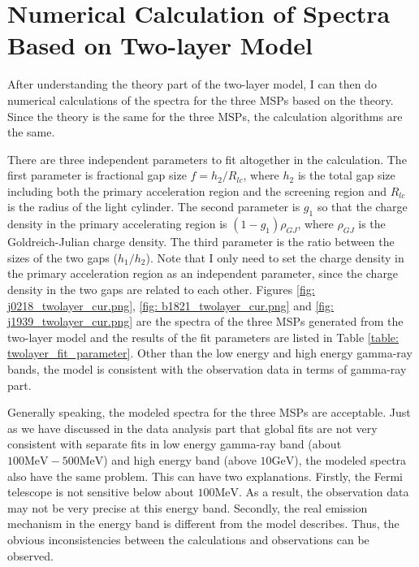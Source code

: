 \documentclass[12pt]{report}
\begin{document}
      \section{Numerical Calculation of Spectra Based on Two-layer Model}
        After understanding the theory part of the two-layer model, 
        I can then do numerical calculations of the spectra for the three MSPs
        based on the theory. Since the theory is the same for the three MSPs, the 
        calculation algorithms are the same. 

        There are three independent parameters to fit altogether in the calculation. 
        The first parameter is fractional gap size $f=h_{2}/R_{lc}$, where $h_{2}$ is the 
        total gap size including both the primary acceleration region and the screening region 
        and $R_{lc}$ is the radius of the light cylinder. The second parameter is $g_{1}$ so that
        the charge density in the primary accelerating region is $\left(1-g_{1}\right) \rho_{GJ}$, 
        where $\rho_{GJ}$ is the Goldreich-Julian charge density. The third parameter is the ratio 
        between the sizes of the two gaps ($h_{1}/h_{2}$). Note that I only need to set the charge 
        density in the primary acceleration region as an independent parameter, since the charge 
        density in the two gaps are related to each other. Figures 
        \ref{fig: j0218_twolayer_cur.png}, \ref{fig: b1821_twolayer_cur.png} and 
        \ref{fig: j1939_twolayer_cur.png}
        are the spectra of the three MSPs generated from the two-layer model and the results of the 
        fit parameters are listed in Table \ref{table: twolayer_fit_parameter}. Other than the 
        low energy and high energy gamma-ray bands, the model is consistent with the observation 
        data in terms of gamma-ray part. 

        Generally speaking, the modeled spectra for the three MSPs are acceptable. Just as 
        we have discussed in the data analysis part that global fits are not very consistent 
        with separate fits in low energy gamma-ray band (about $100\mbox{MeV} - 500\mbox{MeV}$) 
        and high energy band (above $10 \mbox{GeV}$), the modeled spectra also have the same 
        problem. This can have two explanations. Firstly, the Fermi telescope is not sensitive 
        below about $100 \mbox{MeV}$. As a result, the observation data may not be very precise
        at this energy band. Secondly, the real emission mechanism in the energy band is different 
        from the model describes. Thus, the obvious inconsistencies between the calculations 
        and observations can be observed.
 
\end{document}
